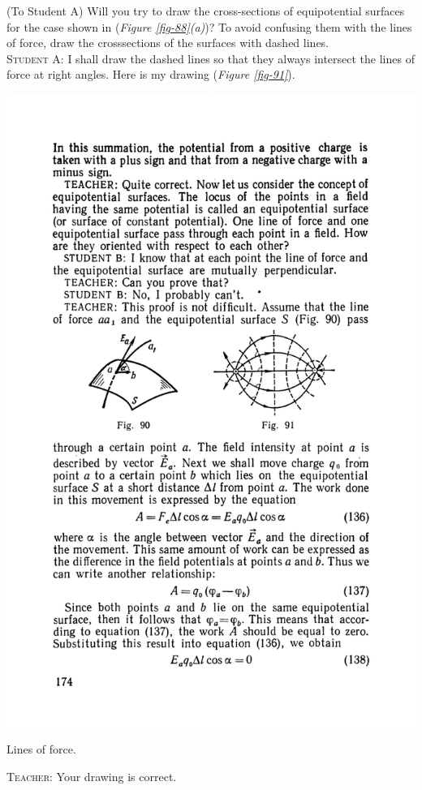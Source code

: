 \documentclass[a4paper,sfsidenotes]{tufte-book}
\begin{document}
(To Student A) Will you try to draw the cross-sections of equipotential surfaces for the case shown in (\emph{Figure \ref{fig-88}(a)})? To avoid confusing them with the lines of force, draw the crosssections of the surfaces with dashed lines.
\\
\textsc{Student A:} I shall draw the dashed lines so that they always intersect the lines of force at right angles. Here is my drawing (\emph{Figure \ref{fig-91}}).
\\
\begin{marginfigure}%
\centering
\includegraphics[width=\linewidth]{fig-091a}
\caption{Lines of force.}
\label{fig-91}
\end{marginfigure}
\textsc{Teacher:} Your drawing is correct.
\end{document}
